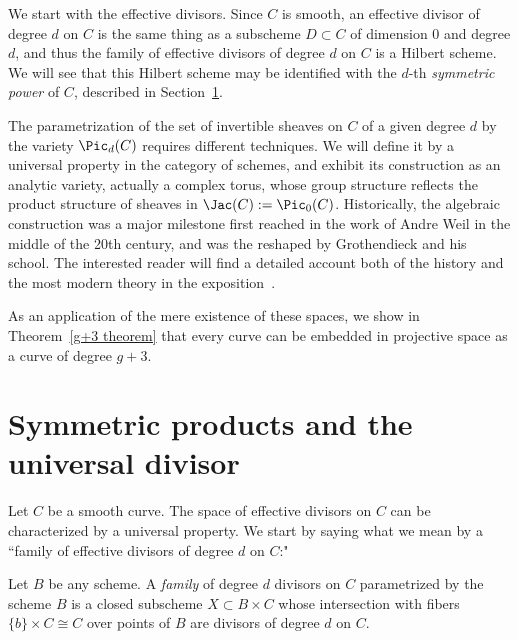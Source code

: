 
We start with the effective divisors. Since $C$ is smooth, an effective divisor of degree $d$ on $C$ is the same thing as a subscheme $D \subset C$ of dimension 0 and degree $d$, and thus
the family of effective divisors of degree $d$ on $C$ is a Hilbert scheme. We will see that this Hilbert scheme may be identified with
the $d$-th \emph{symmetric power}  of $C$, described in Section~\ref{symmetric section}. 

The parametrization of the set of invertible sheaves on $C$ of a given degree $d$ by the variety $\Pic_d(C)$ requires different techniques. We will define it by a universal property in the category of schemes, and exhibit its construction as an analytic variety, actually a complex torus, whose group structure reflects the product structure of
sheaves in $\Jac(C) := \Pic_0(C)$.
Historically, the algebraic construction was a major milestone first reached in the work of Andre Weil in the middle of
the 20th century, and was the reshaped by Grothendieck and his school. The interested reader will find a detailed account both of the history and the most
modern theory in the exposition~\cite{Kleiman}.

As an application of the mere existence of these spaces, we show in Theorem~\ref{g+3 theorem} that every curve can be embedded in projective space as a curve of degree $g+3$.

\section{Symmetric products and the universal divisor}\label{symmetric section}

Let $C$ be a smooth curve. The space of effective divisors on $C$ can be characterized by a universal property. We start by saying what we mean by a ``family of effective divisors of degree $d$ on $C$:"

\begin{definition}
Let $B$ be any scheme. A \emph{family} of degree $d$ divisors on $C$ parametrized by the scheme $B$ is a closed subscheme $X\subset B\times C$ whose intersection with fibers $\{b\} \times C \cong C$ over points of $B$ are divisors of degree $d$ on $C$.
\end{definition}

